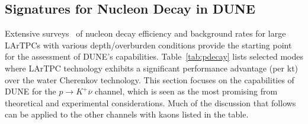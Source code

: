 \subsection{Signatures for Nucleon Decay in DUNE}

Extensive surveys~\cite{Bueno:2007um,Klinger:2015kva} of nucleon decay efficiency 
and background rates for large LArTPCs with various depth/overburden 
conditions provide the starting point for the 
assessment of DUNE's capabilities.  Table~\ref{tab:pdecay} lists selected
modes where LArTPC technology exhibits a significant performance 
advantage (per kt) over the water Cherenkov technology.
This section focuses on the capabilities 
of DUNE for the $p\to K^+\overline{\nu}$ channel, which is seen as the most 
promising from theoretical and experimental 
considerations.  Much of the discussion that follows can be 
applied to the other channels with kaons listed in 
the table.
%
\begin{table}[!htbp]
\caption[Efficiencies and background rates for nucleon decay modes]
        {Efficiencies and background rates (events per \SI{}{\Mtyr}) for nucleon decay 
         channels of interest for a large underground LArTPC~\cite{Bueno:2007um}, and 
         comparison with water Cherenkov detector capabilities.  
         The entries for the water Cherenkov capabilities are based 
         on experience with the \superk{} detector~\cite{kearns_isoups}.  
        }
\begin{center}
\end{center}
\label{tab:pdecay}
\end{table}

